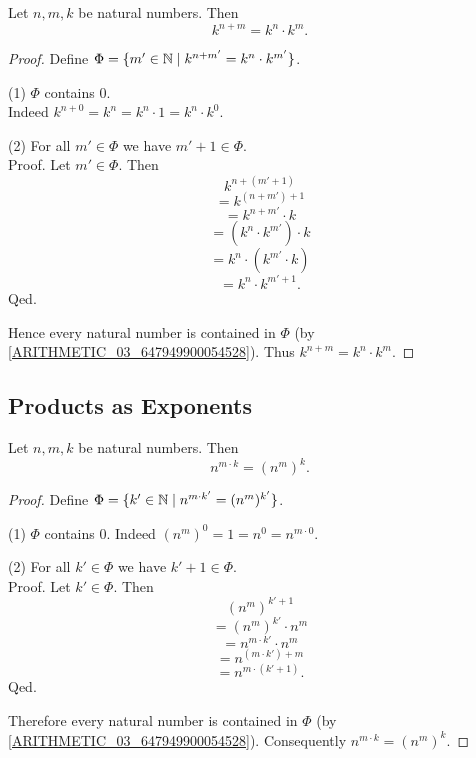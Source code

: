 \documentclass[10pt]{article}
\begin{document}
  \begin{forthel}
    \begin{proposition}
      Let $n, m, k$ be natural numbers.
      Then \[ k^{n + m} = k^{n} \cdot k^{m}. \]
    \end{proposition}
    \begin{proof}
      Define $\Phi = \{ m' \in \mathbb{N} \mid k^{n + m'} = k^{n} \cdot k^{m'} \}$.

      (1) $\Phi$ contains $0$. \\
      Indeed $k^{n + 0}
        = k^{n}
        = k^{n} \cdot 1
        = k^{n} \cdot k^{0}$.

      (2) For all $m' \in \Phi$ we have $m' + 1 \in \Phi$. \\
      Proof.
        Let $m' \in \Phi$.
        Then
        \[  k^{n + (m' + 1)}                  \]
        \[    = k^{(n + m') + 1}              \]
        \[    = k^{n + m'} \cdot k            \]
        \[    = (k^{n} \cdot k^{m'}) \cdot k  \]
        \[    = k^{n} \cdot (k^{m'} \cdot k)  \]
        \[    = k^{n} \cdot k^{m' + 1}.       \]
      Qed.

      Hence every natural number is contained in $\Phi$ (by \cref{ARITHMETIC_03_647949900054528}).
      Thus $k^{n + m} = k^{n} \cdot k^{m}$.
    \end{proof}
  \end{forthel}


  \subsection{Products as Exponents}

  \begin{forthel}
    \begin{proposition}
      Let $n, m, k$ be natural numbers.
      Then \[ n^{m \cdot k} = (n^{m})^{k}. \]
    \end{proposition}
    \begin{proof}
      Define $\Phi = \{ k' \in \mathbb{N} \mid n^{m \cdot k'} = (n^{m})^{k'} \}$.

      (1) $\Phi$ contains $0$.
      Indeed $(n^{m})^{0}
        = 1
        = n^{0}
        = n^{m \cdot 0}$.

      (2) For all $k' \in \Phi$ we have $k' + 1 \in \Phi$. \\
      Proof.
        Let $k' \in \Phi$.
        Then
        \[  (n^{m})^{k' + 1}                \]
        \[    = (n^{m})^{k'} \cdot n^{m}    \]
        \[    = n^{m \cdot k'} \cdot n^{m}  \]
        \[    = n^{(m \cdot k') + m}        \]
        \[    = n^{m \cdot (k' + 1)}.       \]
      Qed.

      Therefore every natural number is contained in $\Phi$ (by \cref{ARITHMETIC_03_647949900054528}).
      Consequently $n^{m \cdot k} = (n^{m})^{k}$.
    \end{proof}
  \end{forthel}
\end{document}
